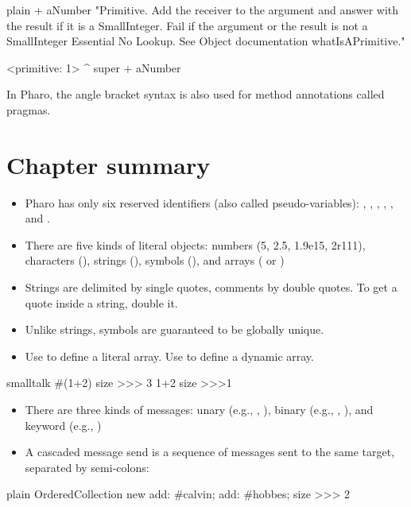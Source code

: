 \documentclass[10pt,twoside,english]{_support/latex/sbabook/sbabook}
\begin{document}
\begin{displaycode}{plain}
+ aNumber
	"Primitive. Add the receiver to the argument and answer with the result
	if it is a SmallInteger. Fail if the argument or the result is not a
	SmallInteger Essential No Lookup. See Object documentation whatIsAPrimitive."

	<primitive: 1>
	^ super + aNumber
\end{displaycode}

In Pharo, the angle bracket syntax is also used for method annotations called pragmas.
\section{Chapter summary}
\begin{itemize}
\item Pharo has only six reserved identifiers (also called pseudo-variables): , , , , , and .
\item There are five kinds of literal objects: numbers (5, 2.5, 1.9e15, 2r111), characters (), strings (), symbols (), and arrays ( or  )
\item Strings are delimited by single quotes, comments by double quotes. To get a quote inside a string, double it.
\item Unlike strings, symbols are guaranteed to be globally unique.
\item Use  to define a literal array. Use  to define a dynamic array.  
\end{itemize}

\begin{displaycode}{smalltalk}
#(1+2) size
>>> 3
{1+2} size
>>>1
\end{displaycode}

\begin{itemize}
\item There are three kinds of messages: unary (e.g., , ), binary (e.g., , ), and keyword (e.g., )
\item A cascaded message send is a sequence of messages sent to the same target, separated by semi-colons: 
\end{itemize}

\begin{displaycode}{plain}
OrderedCollection new add: #calvin; add: #hobbes; size
>>> 2
\end{displaycode}
\end{document}
